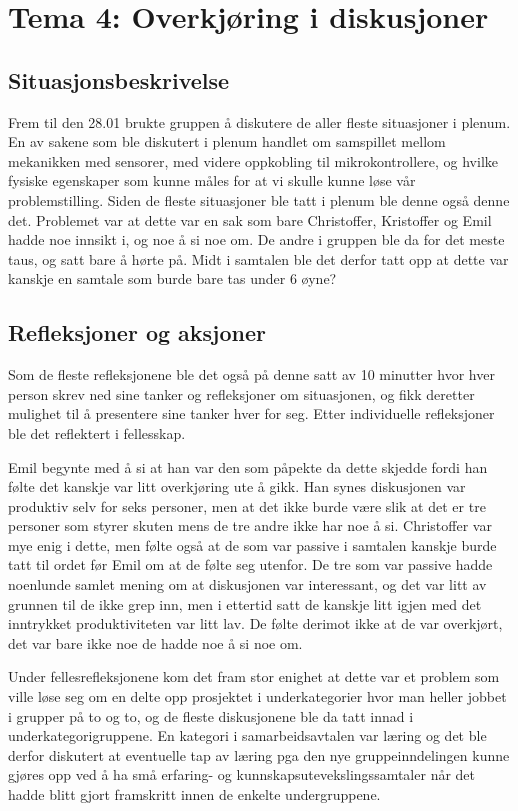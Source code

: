 \chapter{Tema 4: Overkjøring i diskusjoner}
\section {Situasjonsbeskrivelse}
Frem til den 28.01 brukte gruppen å diskutere de aller fleste situasjoner i plenum. En av sakene som ble diskutert i plenum handlet om samspillet mellom mekanikken med sensorer, med videre oppkobling til mikrokontrollere, og hvilke fysiske egenskaper som kunne måles for at vi skulle kunne løse vår problemstilling. Siden de fleste situasjoner ble tatt i plenum ble denne også denne det. Problemet var at dette var en sak som bare Christoffer, Kristoffer og Emil hadde noe innsikt i, og noe å si noe om. De andre i gruppen ble da for det meste taus, og satt bare å hørte på. Midt i samtalen ble det derfor tatt opp at dette var kanskje en samtale som burde bare tas under 6 øyne?
\section{Refleksjoner og aksjoner}
Som de fleste refleksjonene ble det også på denne satt av 10 minutter hvor hver person skrev ned sine tanker og refleksjoner om situasjonen, og fikk deretter mulighet til å presentere sine tanker hver for seg. Etter individuelle refleksjoner ble det reflektert i fellesskap.

Emil begynte med å si at han var den som påpekte da dette skjedde fordi han følte det kanskje var litt overkjøring ute å gikk. Han synes diskusjonen var produktiv selv for seks personer, men at det ikke burde være slik at det er tre personer som styrer skuten mens de tre andre ikke har noe å si. Christoffer var mye enig i dette, men følte også at de som var passive i samtalen kanskje burde tatt til ordet før Emil om at de følte seg utenfor. De tre som var passive hadde noenlunde samlet mening om at diskusjonen var interessant, og det var litt av grunnen til de ikke grep inn, men i ettertid satt de kanskje litt igjen med det inntrykket produktiviteten var litt lav. De følte derimot ikke at de var overkjørt, det var bare ikke noe de hadde noe å si noe om.

Under fellesrefleksjonene kom det fram stor enighet at dette var et problem som ville løse seg om en delte opp prosjektet i underkategorier hvor man heller jobbet i grupper på to og to, og de fleste diskusjonene ble da tatt innad i underkategorigruppene. En kategori i samarbeidsavtalen var læring og det ble derfor diskutert at eventuelle tap av læring pga den nye gruppeinndelingen kunne gjøres opp ved å ha små erfaring- og kunnskapsutevekslingssamtaler når det hadde blitt gjort framskritt innen de enkelte undergruppene.

